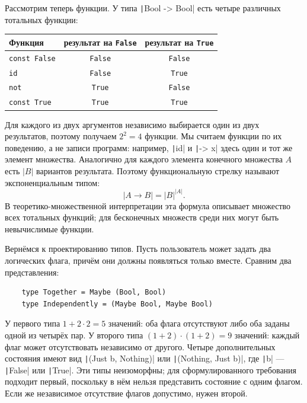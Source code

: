 Рассмотрим теперь функции.
У типа \texttt|Bool -> Bool| есть четыре различных тотальных функции:
\begin{center}
    \begin{tabular}{|l|c|c|}
        \hline
        Функция & результат на \texttt{False} & результат на \texttt{True} \\
        \hline
        \texttt{const False} & \texttt{False} & \texttt{False} \\
        \texttt{id}          & \texttt{False} & \texttt{True} \\
        \texttt{not}         & \texttt{True}  & \texttt{False} \\
        \texttt{const True}  & \texttt{True}  & \texttt{True} \\
        \hline
    \end{tabular}
\end{center}
Для каждого из двух аргументов независимо выбирается один из двух результатов, поэтому получаем $2^2 = 4$ функции.
Мы считаем функции по их поведению, а не записи программ: например, \texttt|id| и \texttt|\x -> x| здесь один и тот же элемент множества.
Аналогично для каждого элемента конечного множества $A$ есть $|B|$ вариантов результата.
Поэтому функциональную стрелку называют экспоненциальным типом:
\[
    |A \to B| = |B|^{|A|}.
\]
В теоретико-множественной интерпретации эта формула описывает множество всех тотальных функций; для бесконечных множеств среди них могут быть невычислимые функции.

Вернёмся к проектированию типов.
Пусть пользователь может задать два логических флага, причём они должны появляться только вместе.
Сравним два представления:
\begin{verbatim}
    type Together = Maybe (Bool, Bool)
    type Independently = (Maybe Bool, Maybe Bool)
\end{verbatim}
У первого типа $1 + 2\cdot 2 = 5$ значений: оба флага отсутствуют либо оба заданы одной из четырёх пар.
У второго типа $(1 + 2)\cdot(1 + 2) = 9$ значений: каждый флаг может отсутствовать независимо от другого.
Четыре дополнительных состояния имеют вид \texttt|(Just b, Nothing)| или \texttt|(Nothing, Just b)|, где \texttt|b| --- \texttt|False| или \texttt|True|.
Эти типы неизоморфны; для сформулированного требования подходит первый, поскольку в нём нельзя представить состояние с одним флагом.
Если же независимое отсутствие флагов допустимо, нужен второй.


